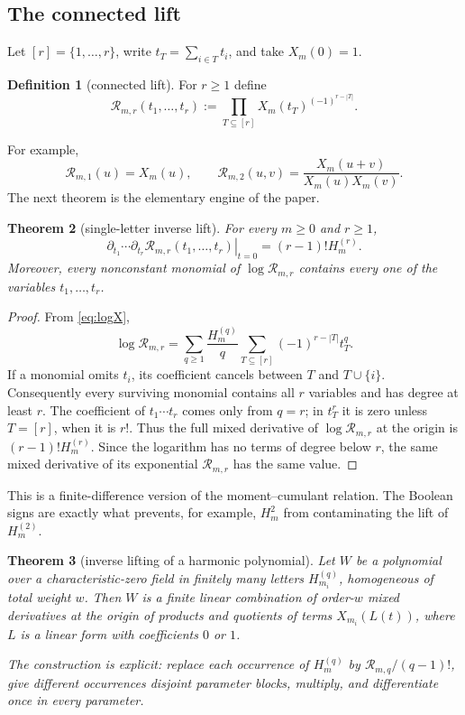 \documentclass[11pt]{article}
\newtheorem{theorem}{Theorem}[section]
\theoremstyle{definition}
\newtheorem{definition}[theorem]{Definition}
\theoremstyle{remark}
\begin{document}
\subsection{The connected lift}

Let $[r]=\{1,\ldots,r\}$, write $t_T=\sum_{i\in T}t_i$, and take $X_m(0)=1$.

\begin{definition}[connected lift]\label{def:connected}
For $r\ge1$ define
\begin{equation}\label{eq:Rdef}
 \mathcal R_{m,r}(t_1,\ldots,t_r)
 :=\prod_{T\subseteq[r]}X_m(t_T)^{(-1)^{r-|T|}}.
\end{equation}
\end{definition}

For example,
\[
 \mathcal R_{m,1}(u)=X_m(u),\qquad
 \mathcal R_{m,2}(u,v)=\frac{X_m(u+v)}{X_m(u)X_m(v)}.
\]
The next theorem is the elementary engine of the paper.

\begin{theorem}[single-letter inverse lift]\label{thm:singlelift}
For every $m\ge0$ and $r\ge1$,
\begin{equation}\label{eq:singlelift}
 \left.\partial_{t_1}\cdots\partial_{t_r}
 \mathcal R_{m,r}(t_1,\ldots,t_r)\right|_{t=0}
 =(r-1)!H_m^{(r)}.
\end{equation}
Moreover, every nonconstant monomial of $\log\mathcal R_{m,r}$ contains every one of the
variables $t_1,\ldots,t_r$.
\end{theorem}

\begin{proof}
From \eqref{eq:logX},
\[
 \log\mathcal R_{m,r}
 =\sum_{q\ge1}\frac{H_m^{(q)}}q
   \sum_{T\subseteq[r]}(-1)^{r-|T|}t_T^q.
\]
If a monomial omits $t_i$, its coefficient cancels between $T$ and $T\cup\{i\}$.
Consequently every surviving monomial contains all $r$ variables and has degree at least
$r$.  The coefficient of $t_1\cdots t_r$ comes only from $q=r$; in $t_T^r$ it is zero
unless $T=[r]$, when it is $r!$.  Thus the full mixed derivative of
$\log\mathcal R_{m,r}$ at the origin is $(r-1)!H_m^{(r)}$.  Since the logarithm has no
terms of degree below $r$, the same mixed derivative of its exponential
$\mathcal R_{m,r}$ has the same value.
\end{proof}

This is a finite-difference version of the moment--cumulant relation.  The Boolean signs
are exactly what prevents, for example, $H_m^2$ from contaminating the lift of
$H_m^{(2)}$.

\begin{theorem}[inverse lifting of a harmonic polynomial]\label{thm:universal}
Let $W$ be a polynomial over a characteristic-zero field in finitely many letters
$H_{m_i}^{(q)}$, homogeneous of total weight $w$.  Then $W$ is a finite linear
combination of order-$w$ mixed derivatives at the origin of products and quotients of
terms $X_{m_i}(L(t))$, where $L$ is a linear form with coefficients $0$ or $1$.

The construction is explicit: replace each occurrence of $H_{m}^{(q)}$ by
$\mathcal R_{m,q}/(q-1)!$, give different occurrences disjoint parameter blocks, multiply,
and differentiate once in every parameter.
\end{theorem}
\end{document}
